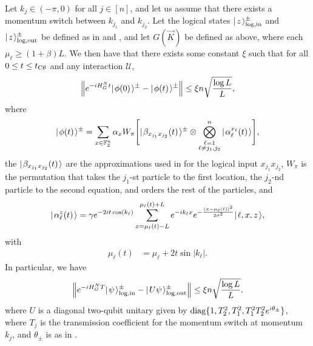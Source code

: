 \documentclass[../thesis-main/thesis-main]{subfiles}
\begin{document}
\begin{lemma}
\label{lem:MP_u_two_qubit_encoded_computation}
  Let $k_j\in (-\pi,0)$ for all $j\in [n]$, and let us assume that there exists a momentum switch between $k_{j_1}$ and $k_{j_2}$.  Let the logical states $|\mspace{2mu} z \mspace{2mu} \rangle^{\pm}_{\text{log},\text{in}}$ and $|\mspace{2mu} z \mspace{2mu} \rangle^{\pm}_{\text{log},\text{out}}$ be defined as in  and , and let $G(\vec{K})$ be defined as above, where each $\mu_\ell \geq (1+\beta) L $.  We then have that there exists some constant $\xi$ such that for all $0 \leq t \leq t_{\mathrm{C}\theta}$ and any interaction $\mathcal{U}$,
\begin{align}
  \Big\Vert e^{-i H_G^N t} |\mspace{2mu} \phi(0) \mspace{2mu} \rangle^{\pm} - |\mspace{2mu} \phi(t) \mspace{2mu} \rangle^{\pm} \Big\Vert \leq \xi n \sqrt{\frac{\log L}{L}},
\end{align}
where
\begin{align}
  |\mspace{2mu} \phi(t) \mspace{2mu} \rangle^{\pm} = \sum_{x\in\mathbb{F}_2^n} \alpha_x W_\pi \Bigg[|\mspace{2mu} \beta_{x_{j_1}x_{j_2}}(t) \mspace{2mu} \rangle^{\pm}\otimes\bigotimes_{\substack{\ell=1\\\ell\neq j_1,j_2}}^n   |\mspace{2mu} \alpha^{x_\ell}_\ell(t) \mspace{2mu} \rangle\Bigg],
\end{align}
the $|\mspace{2mu} \beta_{x_{j_1}x_{j_2}}(t) \mspace{2mu} \rangle$ are the approximations used in  for the logical input $x_{j_1}x_{j_2}$, $W_\pi$ is the permutation that takes the $j_1$-st particle to the first location, the $j_2$-nd particle to the second equation, and orders the rest of the particles,  and 
\begin{align}
  |\mspace{2mu} \alpha_\ell^z(t) \mspace{2mu} \rangle = \gamma e^{-2it \cos (k_\ell)} \sum_{x = \mu_\ell(t)-L}^{\mu_\ell(t) + L} e^{- i k_\ell x} e^{ - \frac{(x-\mu_\ell(t))^2}{2\sigma^2}} |\mspace{2mu} \ell,x,z \mspace{2mu} \rangle,
\end{align}
with
\begin{align}
  \mu_\ell(t) &= \mu_\ell + 2t \sin |k_\ell|.
\end{align}
In particular, we have
\begin{align}
  \Big\Vert e^{-i H_G^N T} |\mspace{2mu} \psi \mspace{2mu} \rangle_{\text{log},\text{in}}^{\pm} - |\mspace{2mu} U\psi \mspace{2mu} \rangle_{\text{log},\text{out}}^{\pm} \Big\Vert \leq \xi n\sqrt{\frac{\log L}{L}}.
\end{align}
where $U$ is a diagonal two-qubit unitary given by $\operatorname{diag}\{1,T_2^2,T_1^2,T_1^2T_2^2e^{i\theta_\pm}\}$, where $T_j$ is the transmission coefficient for the momentum switch at momentum $k_j$, and $\theta_\pm$ is as in .
\end{lemma}
\end{document}
